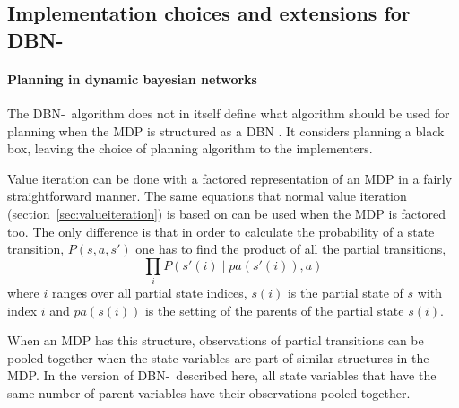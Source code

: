 \subsection{Implementation choices and extensions for DBN-\etre}
\label{sec:e3_our_contribution}

\paragraph{Planning in dynamic bayesian networks}

The DBN-\etre\ algorithm does not in itself define what algorithm should be
used for planning when the MDP is structured as a DBN
\parencite{kearns1999efficient}. It considers planning a black box, leaving the
choice of planning algorithm to the implementers. 

Value iteration can be done with a factored representation of an MDP in a
fairly straightforward manner. The same equations that normal value iteration
(section~\ref{sec:valueiteration}) is based on can be used when the MDP is
factored too. The only difference is that in order to calculate the probability
of a state transition, $P(s, a, s')$ one has to find the product of all the
partial transitions,
\begin{equation}
  \prod\limits _{i} P\left(s'(i) \mid pa(s'(i)), a\right)
\end{equation}
where $i$ ranges over all partial state indices, $s(i)$ is the partial state of $s$ with index $i$ and $pa(s(i))$ is the setting of the
parents of the partial state $s(i)$.

When an MDP has this structure, observations of partial transitions can be
pooled together when the state variables are part of similar structures in the
MDP. In the version of DBN-\etre\ described here, all state variables that have
the same number of parent variables have their observations pooled together. 


